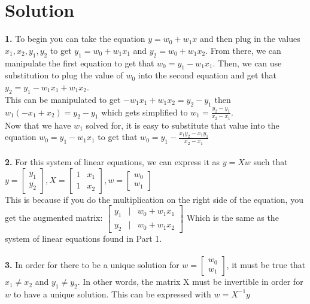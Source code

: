 \documentclass{harvardml}
\theoremstyle{definition}
\theoremstyle{plain}
\newenvironment{solution}
  {\color{blue}\section*{Solution}}
{}
\begin{document}
\begin{solution}
	\textbf{1.} To begin you can take the equation $y = w_0 + w_1x$ and then plug in the values 
    $x_1, x_2, y_1, y_2$ to get $y_1 = w_0 + w_1x_1$ and $y_2 = w_0 + w_1x_2$. From there, we can manipulate the first equation to get that $w_0 = y_1 - w_1x_1$. Then, we can use substitution
    to plug the value of $w_0$ into the second equation and get that $y_2 = y_1 - w_1x_1 + w_1x_2$. \\
    This can be manipulated to get $-w_1x_1 + w_1x_2 = y_2 - y_1$ then $w_1(-x_1 + x_2) = y_2 - y_1$ which gets simplified
    to $w_1 = \frac{y_2 - y_1}{x_2 - x_1}$. \\
    Now that we have $w_1$ solved for, it is easy to substitute that value into the equation $w_0 = y_1 - w_1 x_1$ to get that $w_0 = y_1 - \frac{x_1y_2 - x_1y_1}{x_2 - x_1}$ \\\\

    \textbf{2.} For this system of linear equations, we can express it as $y = Xw$ such that \\
    $ y = \begin{bmatrix} y_1 \\ y_2 \end{bmatrix}, X = \begin{bmatrix} 1 & x_1 \\ 1 & x_2 \end{bmatrix}, w = \begin{bmatrix} w_0 \\ w_1 \end{bmatrix}$ \\
    This is because if you do the multiplication on the right side of the equation, you get the augmented matrix: 
    $\begin{bmatrix}
        y_1 & | & w_0 + w_1x_1 \\
        y_2 & | & w_0 + w_1x_2 
    \end{bmatrix}$ 
    Which is the same as the system of linear equations found in Part 1. \\\\

    \textbf{3.} In order for there to be a unique solution for $w = \begin{bmatrix} w_0 \\ w_1 \end{bmatrix}$, it must be true that $x_1 \neq x_2$ and $y_1 \neq y_2$. 
    In other words, the matrix X must be invertible in order for $w$ to have a unique solution. 
    This can be expressed with $w = X^{-1}y$ \\\\


\end{solution}
\end{document}
